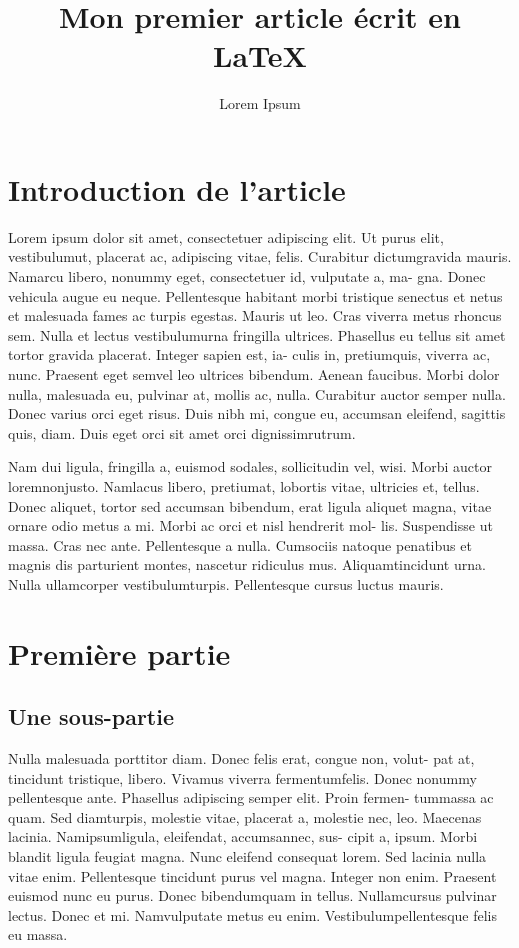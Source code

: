 \documentclass[12pt,twocolumn,twoside]{article}
\title{Mon premier article écrit en \LaTeX}
\author{Lorem Ipsum}
\begin{document}
\maketitle
\section*{Introduction de l'article}

Lorem ipsum dolor sit amet, consectetuer adipiscing elit. Ut purus elit,
vestibulumut, placerat ac, adipiscing vitae, felis. Curabitur dictumgravida
mauris. Namarcu libero, nonummy eget, consectetuer id, vulputate a, ma- gna. Donec vehicula augue eu neque. Pellentesque habitant morbi tristique
senectus et netus et malesuada fames ac turpis egestas. Mauris ut leo. Cras
viverra metus rhoncus sem. Nulla et lectus vestibulumurna fringilla ultrices.
Phasellus eu tellus sit amet tortor gravida placerat. Integer sapien est, ia-
culis in, pretiumquis, viverra ac, nunc. Praesent eget semvel leo ultrices
bibendum. Aenean faucibus. Morbi dolor nulla, malesuada eu, pulvinar at,
mollis ac, nulla. Curabitur auctor semper nulla. Donec varius orci eget risus.
Duis nibh mi, congue eu, accumsan eleifend, sagittis quis, diam. Duis eget
orci sit amet orci dignissimrutrum.

Nam dui ligula, fringilla a, euismod sodales, sollicitudin vel, wisi. Morbi
auctor loremnonjusto. Namlacus libero, pretiumat, lobortis vitae, ultricies
et, tellus. Donec aliquet, tortor sed accumsan bibendum, erat ligula aliquet
magna, vitae ornare odio metus a mi. Morbi ac orci et nisl hendrerit mol-
lis. Suspendisse ut massa. Cras nec ante. Pellentesque a nulla. Cumsociis
natoque penatibus et magnis dis parturient montes, nascetur ridiculus mus.
Aliquamtincidunt urna. Nulla ullamcorper vestibulumturpis. Pellentesque
cursus luctus mauris.

\section{Première partie}
\subsection{Une sous-partie}
Nulla malesuada porttitor diam. Donec felis erat, congue non, volut-
pat at, tincidunt tristique, libero. Vivamus viverra fermentumfelis. Donec
nonummy pellentesque ante. Phasellus adipiscing semper elit. Proin fermen-
tummassa ac quam. Sed diamturpis, molestie vitae, placerat a, molestie
nec, leo. Maecenas lacinia. Namipsumligula, eleifendat, accumsannec, sus-
cipit a, ipsum. Morbi blandit ligula feugiat magna. Nunc eleifend consequat
lorem. Sed lacinia nulla vitae enim. Pellentesque tincidunt purus vel magna.
Integer non enim. Praesent euismod nunc eu purus. Donec bibendumquam
in tellus. Nullamcursus pulvinar lectus. Donec et mi. Namvulputate metus
eu enim. Vestibulumpellentesque felis eu massa.
\end{document}

